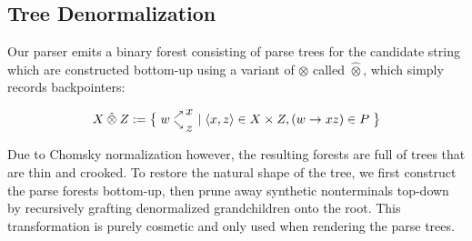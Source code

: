 \documentclass[sigplan,review,anonymous,acmsmall]{acmart}\settopmatter{printfolios=false,printccs=false,printacmref=false}
\begin{document}
\pagebreak\subsection{Tree Denormalization}\label{sec:denormalization}


Our parser emits a binary forest consisting of parse trees for the candidate string which are constructed bottom-up using a variant of $\otimes$ called $\hat{\otimes}$, which simply records backpointers:

\begin{align}
   X\:\hat{\otimes}\:Z := \big\{\;w\hphantom{.}^{\nearrow}_{\searrow}\nobarfrac{x}{z} \mid \langle x, z\rangle \in X \times Z, (w\rightarrow xz) \in P\;\big\}
\end{align}

Due to Chomsky normalization however, the resulting forests are full of trees that are thin and crooked. To restore the natural shape of the tree, we first construct the parse forests bottom-up, then prune away synthetic nonterminals top-down by recursively grafting denormalized grandchildren onto the root. This transformation is purely cosmetic and only used when rendering the parse trees.
\end{document}
